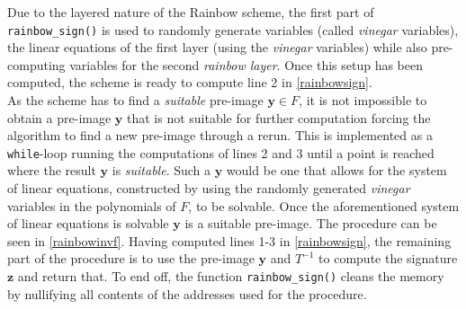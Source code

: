 Due to the layered nature of the Rainbow scheme, the first part of \texttt{rainbow\_sign()} is used to randomly generate variables (called \emph{vinegar} variables), the linear equations of the first layer (using the \emph{vinegar} variables) while also pre-computing variables for the second \emph{rainbow layer}. Once this setup has been computed, the scheme is ready to compute line 2 in \cref{rainbowsign}.\medskip\\
As the scheme has to find a \emph{suitable} pre-image $\textbf{y} \in F$, it is not impossible to obtain a pre-image $\textbf{y}$ that is not suitable for further computation forcing the algorithm to find a new pre-image through a rerun. This is implemented as a \texttt{while}-loop running the computations of lines 2 and 3 until a point is reached where the result $\textbf{y}$ is \emph{suitable}. Such a $\textbf{y}$ would be one that allows for the system of linear equations, constructed by using the randomly generated \emph{vinegar} variables in the polynomials of $F$, to be solvable. Once the aforementioned system of linear equations is solvable $\textbf{y}$ is a suitable pre-image. The procedure can be seen in \cref{rainbowinvf}. Having computed lines 1-3 in \cref{rainbowsign}, the remaining part of the procedure is to use the pre-image $\textbf{y}$ and $T^{-1}$ to compute the signature $\textbf{z}$ and return that. To end off, the function \texttt{rainbow\_sign()} cleans the memory by nullifying all contents of the addresses used for the procedure.
